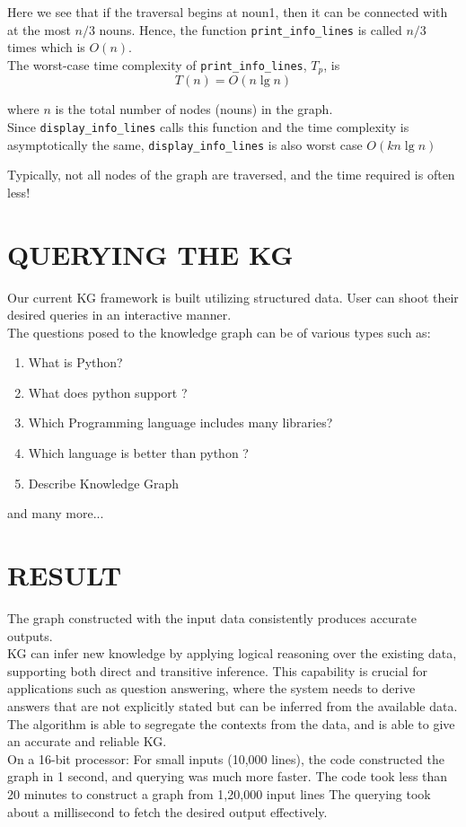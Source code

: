 \documentclass[conference]{IEEEtran}
\begin{document}
Here we see that if the traversal begins at noun1, then it can be connected with at the most $n/3$ nouns. Hence, the function \texttt{print\_info\_lines} is called $n/3$ times which is $O(n)$.
\\The worst-case time complexity of \texttt{print\_info\_lines}, $T_p$, is
\begin{equation}
	T(n) = O(n \lg n)
\end{equation}


where $n$ is the total number of nodes (nouns) in the graph. 
\\
Since \texttt{display\_info\_lines} calls this function and the time complexity is asymptotically the same, \texttt{display\_info\_lines} is also worst case $O(kn \lg n)$

Typically, not all nodes of the graph are traversed, and the time required is often less!



\section{QUERYING THE KG}
Our current KG framework is built utilizing structured data. User can shoot their desired queries in an interactive manner. 
\\
The questions posed to the knowledge graph can be of various types such as:
\begin{enumerate}
    \item What is Python?
    \item What does python support ?
    \item Which Programming language includes many libraries?
    \item Which language is better than python ?
    \item Describe Knowledge Graph
\end{enumerate}
and many more...


\section*{RESULT}
The graph constructed with the input data consistently produces accurate outputs.
\\
KG can infer new knowledge by applying logical reasoning over the existing data, supporting both direct and transitive inference. This capability is crucial for applications such as question answering, where the system needs to derive answers that are not explicitly stated but can be inferred from the available data.
\\
The algorithm is able to segregate the contexts from the data, and is able to give an accurate and reliable KG.
\\
On a 16-bit processor:
For small inputs (10,000 lines), the code constructed the graph in 1 second, and querying was much more faster.
The code took less than 20 minutes to construct a graph from 1,20,000 input lines 
The querying took about a millisecond to fetch the desired output effectively.
\end{document}
